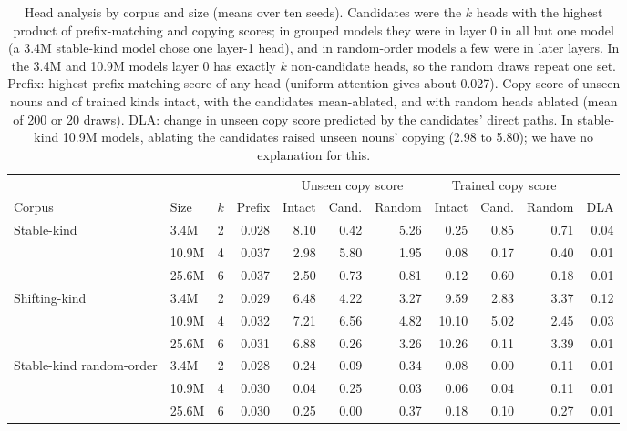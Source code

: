 \begin{table}[!htbp]
\centering\small

\begin{tabular}{@{}llrrrrrrrrr@{}}
\toprule
 & & & & \multicolumn{3}{c}{Unseen copy score} & \multicolumn{3}{c}{Trained copy score} & \\
\cmidrule(lr){5-7}\cmidrule(lr){8-10}
Corpus & Size & $k$ & Prefix & Intact & Cand. & Random & Intact & Cand. & Random & DLA \\
\midrule
Stable-kind & 3.4M & 2 & 0.028 & 8.10 & \textminus{}0.42 & 5.26 & \textminus{}0.25 & \textminus{}0.85 & \textminus{}0.71 & \textminus{}0.04 \\
 & 10.9M & 4 & 0.037 & 2.98 & 5.80 & 1.95 & 0.08 & 0.17 & \textminus{}0.40 & \textminus{}0.01 \\
 & 25.6M & 6 & 0.037 & 2.50 & 0.73 & 0.81 & 0.12 & \textminus{}0.60 & \textminus{}0.18 & \textminus{}0.01 \\
Shifting-kind & 3.4M & 2 & 0.029 & 6.48 & 4.22 & 3.27 & 9.59 & 2.83 & 3.37 & \textminus{}0.12 \\
 & 10.9M & 4 & 0.032 & 7.21 & 6.56 & 4.82 & 10.10 & 5.02 & 2.45 & \textminus{}0.03 \\
 & 25.6M & 6 & 0.031 & 6.88 & 0.26 & 3.26 & 10.26 & \textminus{}0.11 & 3.39 & \textminus{}0.01 \\
Stable-kind random-order & 3.4M & 2 & 0.028 & \textminus{}0.24 & \textminus{}0.09 & \textminus{}0.34 & \textminus{}0.08 & 0.00 & \textminus{}0.11 & \textminus{}0.01 \\
 & 10.9M & 4 & 0.030 & 0.04 & 0.25 & 0.03 & \textminus{}0.06 & 0.04 & \textminus{}0.11 & \textminus{}0.01 \\
 & 25.6M & 6 & 0.030 & \textminus{}0.25 & 0.00 & \textminus{}0.37 & \textminus{}0.18 & \textminus{}0.10 & \textminus{}0.27 & \textminus{}0.01 \\
\bottomrule
\end{tabular}
\caption{Head analysis by corpus and size (means over ten seeds). Candidates were the $k$ heads with the highest product of prefix-matching and copying scores; in grouped models they were in layer 0 in all but one model (a 3.4M stable-kind model chose one layer-1 head), and in random-order models a few were in later layers. In the 3.4M and 10.9M models layer 0 has exactly $k$ non-candidate heads, so the random draws repeat one set. Prefix: highest prefix-matching score of any head (uniform attention gives about 0.027). Copy score of unseen nouns and of trained kinds intact, with the candidates mean-ablated, and with random heads ablated (mean of 200 or 20 draws). DLA: change in unseen copy score predicted by the candidates' direct paths. In stable-kind 10.9M models, ablating the candidates raised unseen nouns' copying (2.98 to 5.80); we have no explanation for this.}
\label{tab:M4}
\end{table}


